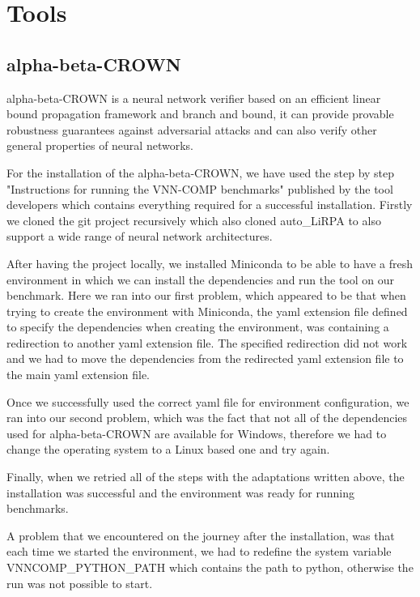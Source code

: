 \documentclass[12pt,a4paper]{report}
\newcommand\tab[1][5mm]{\hspace*{#1}}
\begin{document}
\chapter{Tools}
\section{alpha-beta-CROWN}
\tab alpha-beta-CROWN is a neural network verifier based on an efficient linear bound propagation framework and branch and bound, it can provide provable robustness guarantees against adversarial attacks and can also verify other general properties of neural networks\cite{alpha-beta-crown-git}.

\tab For the installation of the alpha-beta-CROWN, we have used the step by step "Instructions for running the VNN-COMP benchmarks"\cite{alpha-beta-instructions} published by the tool developers which contains everything required for a successful installation. Firstly we cloned the git project recursively which also cloned auto\_LiRPA\cite{auto_lirpa_repo} to also support a wide range of neural network architectures.

After having the project locally, we installed Miniconda\cite{miniconda} to be able to have a fresh environment in which we can install the dependencies and run the tool on our benchmark. Here we ran into our first problem, which appeared to be that when trying to create the environment with Miniconda\cite{miniconda}, the yaml extension file defined to specify the dependencies when creating the environment, was containing a redirection to another yaml extension file. The specified redirection did not work and we had to move the dependencies from the redirected yaml extension file to the main yaml extension file.

Once we successfully used the correct yaml file for environment configuration, we ran into our second problem, which was the fact that not all of the dependencies used for alpha-beta-CROWN are available for Windows, therefore we had to change the operating system to a Linux based one and try again.

Finally, when we retried all of the steps with the adaptations written above, the installation was successful and the environment was ready for running benchmarks.

A problem that we encountered on the journey after the installation, was that each time we started the environment, we had to redefine the system variable VNNCOMP\_PYTHON\_PATH which contains the path to python, otherwise the run was not possible to start.
\end{document}
